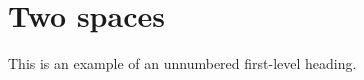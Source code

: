 \section{\label{sec:two spaces}Two spaces}
This is an example of an unnumbered first-level heading.


\endinput  %

